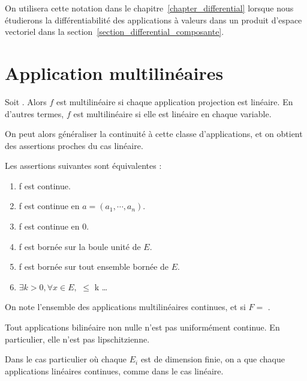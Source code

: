 On utilisera cette notation dans le chapitre~\ref{chapter_differential} lorsque nous
étudierons la différentiabilité des applications à valeurs dans un produit
d'espace vectoriel dans la section~\ref{section_differential_composante}.

\section{Application multilinéaires}

\begin{definition}
	Soit . Alors $f$ est multilinéaire si chaque
	application projection est linéaire. En d'autres termes, $f$ est
	multilinéaire si elle est linéaire en chaque variable.
\end{definition}

On peut alors généraliser la continuité à cette classe d'applications, et on
obtient des assertions proches du cas linéaire.

\begin{proposition}
	Les assertions suivantes sont équivalentes :

	\begin{enumerate}
		\item f est continue.
		\item f est continue en $a = (a_{1}, \cdots, a_{n})$.
		\item f est continue en $0$.
		\item f est bornée sur la boule unité de $E$.
		\item f est bornée sur tout ensemble bornée de $E$.
		\item $\exists k > 0, \forall x \in E,$  $\leq$ k  \ldots
	\end{enumerate}
\end{proposition}

On note  l'ensemble des applications
multilinéaires continues, et  si $F = $
.

\begin{remarque}
	Tout applications bilinéaire non nulle n'est pas uniformément continue. En
	particulier, elle n'est pas lipschitzienne.
\end{remarque}

Dans le cas particulier où chaque $E_{i}$ est de dimension finie, on a que
chaque applications linéaires continues, comme dans le cas linéaire.

